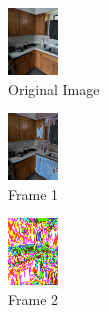 \documentclass[11pt]{article}
\begin{document}
\begin{center}
\includegraphics{kitchenShrunkresized}\\
Original Image\\
\end{center}
\begin{center}
\includegraphics{kitchenShrunkframes0}\\
Frame 1\\
\end{center}
\begin{center}
\includegraphics{kitchenShrunkframes1}\\
Frame 2\\
\end{center}
\newpage
\end{document}
